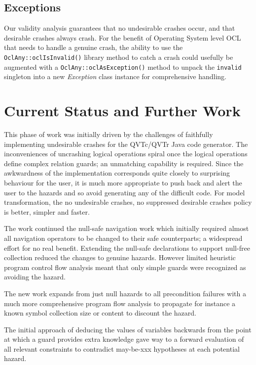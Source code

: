 \documentclass{llncs}
\begin{document}
\subsection{Exceptions}

Our validity analysis guarantees that no undesirable crashes occur, and that desirable crashes always crash. For the benefit of Operating System level OCL that needs to handle a genuine crash, the ability to use the \verb|OclAny::oclIsInvalid()| library method to catch a crash could usefully be augmented with a \verb|OclAny::oclAsException()| method to unpack the \verb|invalid| singleton into a new \emph{Exception} class instance for comprehensive handling.

\section{Current Status and Further Work}\label{Current Status and Further Work}

This phase of work was initially driven by the challenges of faithfully implementing undesirable crashes for the QVTc/QVTr Java code generator. The inconveniences of uncrashing logical operations spiral once the logical operations define complex relation guards; an unmatching capability is required. Since the awkwardness of the implementation corresponds quite closely to surprising behaviour for the user, it is much more appropriate to push back and alert the user to the hazards and so avoid generating any of the difficult code. For model transformation, the no undesirable crashes, no suppressed desirable crashes policy is better, simpler and faster.

The work continued the null-safe navigation work \cite{Safe OCL} which initially required almost all navigation operators to be changed to their safe counterparts; a widespread effort for no real benefit. Extending the null-safe declarations to support null-free collection reduced the changes to genuine hazards. However limited heuristic program control flow analysis meant that only simple guards were recognized as avoiding the hazard.

The new work expands from just null hazards to all precondition failures with a much more comprehensive program flow analysis to propagate for instance a known symbol collection size or content to discount the hazard.

The initial approach of deducing the values of variables backwards from the point at which a guard provides extra knowledge gave way to a forward evaluation of all relevant constraints to contradict may-be-xxx hypotheses at each potential hazard.
\end{document}
